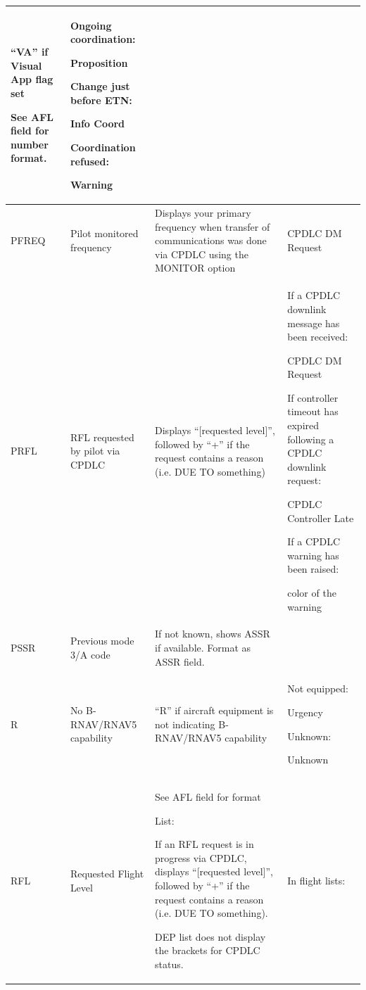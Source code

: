 \documentclass[11pt,a4paper]{memoir}
\begin{document}
\begin{longtable}{|p{2.5cm}|p{2.5cm}|p{4.5cm}|p{4.5cm}|}
      “VA” if Visual App flag set
      
      See AFL field for number format. &
      Ongoing coordination:
      
      Proposition 
      \bigskip
      
      Change just before ETN: 
      
      Info Coord 
      \bigskip
      
      Coordination refused: 
      
      Warning \\ \hline
    PFREQ &
      Pilot monitored frequency &
      Displays your primary frequency  when transfer of communications  was done via CPDLC using the  MONITOR option &
      CPDLC DM Request \\ \hline
    PRFL &
      RFL requested by pilot via  CPDLC &
      Displays “{[}requested level{]}”,  followed by “+” if the request  contains a reason (i.e. DUE TO  something) &
      If a CPDLC downlink  message has been  received:  
      
      CPDLC DM Request 
      \bigskip
      
      If controller timeout has expired following a CPDLC downlink request:
      
      CPDLC Controller Late 
      \bigskip
      
      If a CPDLC warning has been raised: 
      
      color of the warning \\ \hline
    PSSR &
      Previous mode 3/A code &
      If not known, shows ASSR if  available. Format as ASSR field. &
       \\ \hline
    R &
      No B-RNAV/RNAV5  capability &
      “R” if aircraft equipment is not  indicating B-RNAV/RNAV5 capability &
      Not equipped:
      
      Urgency
      \bigskip 
      
      Unknown: 
      
      Unknown \\ \hline
    RFL &
      Requested Flight Level &
      See AFL field for format 
      \bigskip
      
      List: 
      
      If an RFL request is in progress via CPDLC, displays “{[}requested level{]}”, followed by “+” if the request contains a reason (i.e. DUE TO  something). 
      \bigskip
      
      DEP list does not display the  brackets for CPDLC status. &
      In flight lists: 
      

\end{longtable}
\end{document}
